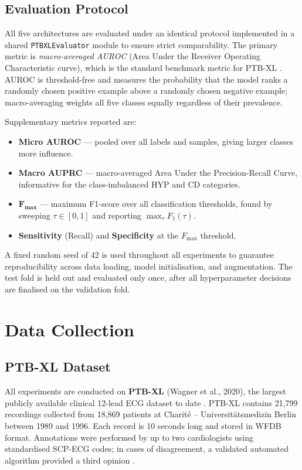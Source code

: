 \subsection*{Evaluation Protocol}

All five architectures are evaluated under an identical protocol
implemented in a shared \texttt{PTBXLEvaluator} module to ensure strict
comparability.
The primary metric is \emph{macro-averaged AUROC} (Area Under the
Receiver Operating Characteristic curve), which is the standard
benchmark metric for PTB-XL \cite{ref6}.
AUROC is threshold-free and measures the probability that the model
ranks a randomly chosen positive example above a randomly chosen
negative example; macro-averaging weights all five classes equally
regardless of their prevalence.

Supplementary metrics reported are:

\begin{itemize}
  \item \textbf{Micro AUROC} --- pooled over all labels and samples,
        giving larger classes more influence.
  \item \textbf{Macro AUPRC} --- macro-averaged Area Under the
        Precision-Recall Curve, informative for the class-imbalanced
        HYP and CD categories.
  \item $\mathbf{F_{\max}}$ --- maximum F1-score over all classification
        thresholds, found by sweeping $\tau \in [0,1]$ and reporting
        $\max_\tau F_1(\tau)$.
  \item \textbf{Sensitivity} (Recall) and \textbf{Specificity} at the
        $F_{\max}$ threshold.
\end{itemize}

\noindent A fixed random seed of 42 is used throughout all experiments
to guarantee reproducibility across data loading, model initialisation,
and augmentation.
The test fold is held out and evaluated only once, after all
hyperparameter decisions are finalised on the validation fold.

\section{Data Collection}
\label{sec:data_collection}

\subsection{PTB-XL Dataset}

All experiments are conducted on \textbf{PTB-XL} (Wagner et al., 2020),
the largest publicly available clinical 12-lead ECG dataset to date
\cite{ref12}.
PTB-XL contains 21{,}799 recordings collected from 18{,}869 patients at
Charit\'{e} -- Universit\"{a}tsmedizin Berlin between 1989 and 1996.
Each record is 10 seconds long and stored in WFDB format.
Annotations were performed by up to two cardiologists using standardised
SCP-ECG codes; in cases of disagreement, a validated automated algorithm
provided a third opinion \cite{ref12,ref16}.

